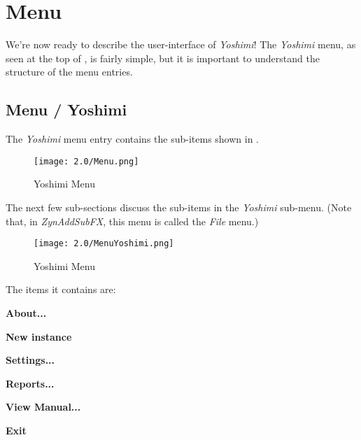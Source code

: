 %
%
%

\section{Menu}
\label{sec:menu}

   We're now ready to describe the user-interface of \textsl{Yoshimi}!
   The \textsl{Yoshimi} menu, as seen at the top of
   ,
   is fairly simple, but it is important to understand the
   structure of the menu entries.

\subsection{Menu / Yoshimi}
\label{subsec:menu_yoshimi}

   The \textsl{Yoshimi}
   menu entry contains the sub-items shown in
   .
   \begin{figure}[H]
   \centering
   \texttt{[image: 2.0/Menu.png]}
   \caption[Yoshimi Menu, Exit]{Yoshimi Menu}
   \label{fig:yoshimi_menu_items}
\end{figure}
   The next few sub-sections discuss the sub-items in the
   \textsl{Yoshimi} sub-menu.
   (Note that, in \textsl{ZynAddSubFX}, this menu is called the
   \textsl{File} menu.)

\begin{figure}[H]
   \centering
   \texttt{[image: 2.0/MenuYoshimi.png]}
   \caption[Yoshimi Menu, Exit]{Yoshimi Menu}
   \label{fig:yoshimi_view_yoshimi}
\end{figure}

   The items it contains are:

   \begin{enumber}
      \item \textbf{About...}
      \item \textbf{New instance}
      \item \textbf{Settings...}
      \item \textbf{Reports...}
      \item \textbf{View Manual...}
      \item \textbf{Exit}
   \end{enumber}

